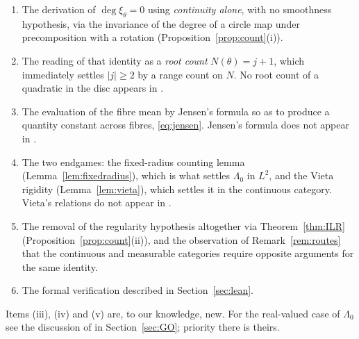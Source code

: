 \documentclass[11pt]{amsart}
\theoremstyle{remark}
\DeclareMathOperator{\dg}{deg}
\begin{document}
\begin{enumerate}
\item[(i)] The derivation of $\dg\xi_\theta=0$ using \emph{continuity alone}, with no
smoothness hypothesis, via the invariance of the degree of a circle map under precomposition
with a rotation (Proposition~\ref{prop:count}(i)).
\item[(ii)] The reading of that identity as a \emph{root count} $N(\theta)=j+1$, which
immediately settles $|j|\geq2$ by a range count on $N$. No root count of a quadratic in the
disc appears in \cite{Oussa}.
\item[(iii)] The evaluation of the fibre mean by Jensen's formula so as to produce a quantity
constant across fibres, \eqref{eq:jensen}. Jensen's formula does not appear in \cite{Oussa}.
\item[(iv)] The two endgames: the fixed-radius counting lemma
(Lemma~\ref{lem:fixedradius}), which is what settles $\Lambda_0$ in $L^2$, and the Vieta
rigidity (Lemma~\ref{lem:vieta}), which settles it in the continuous category. Vieta's
relations do not appear in \cite{Oussa}.
\item[(v)] The removal of the regularity hypothesis altogether via Theorem~\ref{thm:ILR}
(Proposition~\ref{prop:count}(ii)), and the observation of Remark~\ref{rem:routes} that the
continuous and measurable categories require opposite arguments for the same identity.
\item[(vi)] The formal verification described in Section~\ref{sec:lean}.
\end{enumerate}

Items (iii), (iv) and (v) are, to our knowledge, new. For the real-valued case of $\Lambda_0$
see the discussion of \cite{GO} in Section~\ref{sec:GO}; priority there is theirs.
\end{document}
